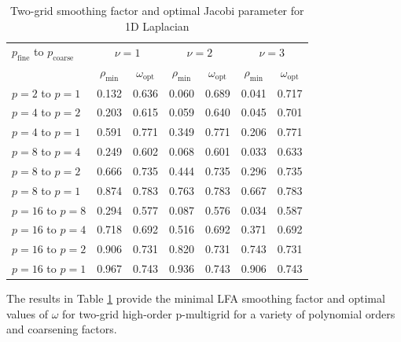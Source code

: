 \documentclass[review]{siamart190516}
\begin{document}
\begin{table}[ht!]
\begin{center}
\begin{tabular}{l cc cc cc}
  \toprule
  $p_{\text{fine}}$ to $p_{\text{coarse}}$  &  \multicolumn{2}{c}{$\nu = 1$}          &  \multicolumn{2}{c}{$\nu = 2$}          &  \multicolumn{2}{c}{$\nu = 3$}          \\
                                            &  $\rho_{\min}$ & $\omega_{\text{opt}}$  &  $\rho_{\min}$ & $\omega_{\text{opt}}$  &  $\rho_{\min}$ & $\omega_{\text{opt}}$  \\
  \midrule
  $p = 2$ to $p = 1$          &  0.132 & 0.636  &  0.060 & 0.689  &  0.041 & 0.717   \\
  $p = 4$ to $p = 2$          &  0.203 & 0.615  &  0.059 & 0.640  &  0.045 & 0.701   \\
  $p = 4$ to $p = 1$          &  0.591 & 0.771  &  0.349 & 0.771  &  0.206 & 0.771   \\
  $p = 8$ to $p = 4$          &  0.249 & 0.602  &  0.068 & 0.601  &  0.033 & 0.633   \\
  $p = 8$ to $p = 2$          &  0.666 & 0.735  &  0.444 & 0.735  &  0.296 & 0.735   \\
  $p = 8$ to $p = 1$          &  0.874 & 0.783  &  0.763 & 0.783  &  0.667 & 0.783   \\
  $p = 16$ to $p = 8$         &  0.294 & 0.577  &  0.087 & 0.576  &  0.034 & 0.587   \\
  $p = 16$ to $p = 4$         &  0.718 & 0.692  &  0.516 & 0.692  &  0.371 & 0.692   \\
  $p = 16$ to $p = 2$         &  0.906 & 0.731  &  0.820 & 0.731  &  0.743 & 0.731   \\
  $p = 16$ to $p = 1$         &  0.967 & 0.743  &  0.936 & 0.743  &  0.906 & 0.743   \\
  \bottomrule
\end{tabular}
\end{center}
\caption{Two-grid smoothing factor and optimal Jacobi parameter for 1D Laplacian}
\label{table:two_grid_1d}
\end{table}

The results in Table \ref{table:two_grid_1d} provide the minimal LFA smoothing factor and optimal values of $\omega$ for two-grid high-order p-multigrid for a variety of polynomial orders and coarsening factors.
\end{document}
